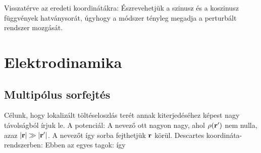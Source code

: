 \begin{itemize}
      Visszatérve az eredeti koordinátákra:
      Észrevehetjük a szinusz és a koszinusz függvények hatványsorát, úgyhogy a módszer tényleg megadja a perturbált rendszer mozgását.
      
    \end{itemize}
   
 \section{Elektrodinamika}
  
  \subsection{Multipólus sorfejtés}\label{eq:ss-11multipol}
   
   Célunk, hogy lokalizált töltéseloszlás terét annak kiterjedéséhez képest nagy távolságból írjuk le. A potenciál:
   A nevező ott nagyon nagy, ahol $\rho(\mathbf{r}')$ nem nulla, azaz $\left\lvert\mathbf{r}\right\rvert\gg\left\lvert\mathbf{r}'\right\rvert$. A nevezőt így sorba fejthetjük $\mathbf{r}$ körül. Descartes koordináta-rendszerben:
   Ebben az egyes tagok:
   így 
   

